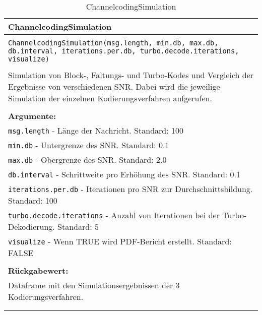 \begin{longtable}{|p{\textwidth}|}
\hline
\rowcolor{lightblue}
ChannelcodingSimulation\\
\hline
\\
\texttt{ChannelcodingSimulation(msg.length, min.db, max.db, db.interval, iterations.per.db, turbo.decode.iterations, visualize)}\\
\\
Simulation von Block-, Faltungs- und Turbo-Kodes und Vergleich der Ergebnisse von verschiedenen SNR. Dabei wird die jeweilige Simulation der einzelnen Kodierungsverfahren aufgerufen.\\
\\
\textbf{Argumente:}\\
\texttt{msg.length} - Länge der Nachricht. Standard: 100\\
\texttt{min.db} - Untergrenze des SNR. Standard: 0.1\\
\texttt{max.db} - Obergrenze des SNR. Standard: 2.0\\
\texttt{db.interval} - Schrittweite pro Erhöhung des SNR. Standard: 0.1\\
\texttt{iterations.per.db} - Iterationen pro SNR zur Durchschnittsbildung. Standard: 100\\
\texttt{turbo.decode.iterations} - Anzahl von Iterationen bei der Turbo-Dekodierung. Standard: 5\\
\texttt{visualize} - Wenn TRUE wird PDF-Bericht erstellt. Standard: FALSE\\
\\
\textbf{Rückgabewert:}\\
Dataframe mit den Simulationsergebnissen der 3 Kodierungsverfahren.\\
\\
\hline
\caption{ChannelcodingSimulation}
\label{func:channel_simu}
\end{longtable}